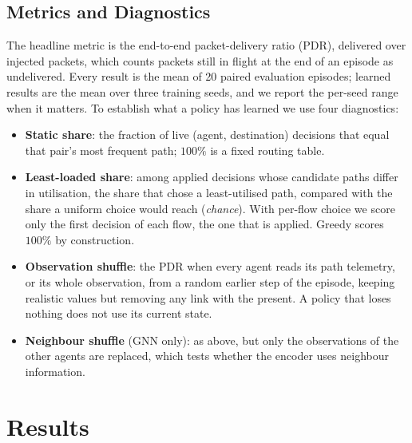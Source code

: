 \documentclass[10pt,journal,comsoc]{IEEEtran}
\begin{document}
\subsection{Metrics and Diagnostics}
\label{subsec:metrics}
The headline metric is the end-to-end packet-delivery ratio (PDR), delivered over injected packets, which counts packets still in flight at the end of an episode as undelivered. Every result is the mean of 20 paired evaluation episodes; learned results are the mean over three training seeds, and we report the per-seed range when it matters. To establish what a policy has learned we use four diagnostics:
\begin{itemize}
  \item \textbf{Static share}: the fraction of live (agent, destination) decisions that equal that pair's most frequent path; $100\%$ is a fixed routing table.
  \item \textbf{Least-loaded share}: among applied decisions whose candidate paths differ in utilisation, the share that chose a least-utilised path, compared with the share a uniform choice would reach (\emph{chance}). With per-flow choice we score only the first decision of each flow, the one that is applied. Greedy scores $100\%$ by construction.
  \item \textbf{Observation shuffle}: the PDR when every agent reads its path telemetry, or its whole observation, from a random earlier step of the episode, keeping realistic values but removing any link with the present. A policy that loses nothing does not use its current state.
  \item \textbf{Neighbour shuffle} (GNN only): as above, but only the observations of the other agents are replaced, which tests whether the encoder uses neighbour information.
\end{itemize}

\section{Results} \label{sec:results}
\end{document}
